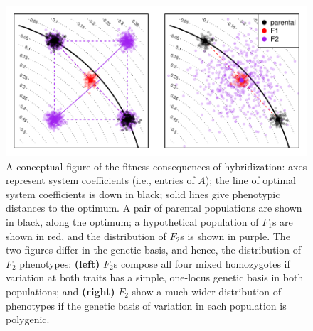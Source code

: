 \documentclass{article}
\newcommand{\1}{\mathbbm{1}}
\begin{document}
\begin{figure}[H]
\centering
\includegraphics{figures/conceptual_fig}
\caption{
    \label{fig:conceptual_fig}
    A conceptual figure of the fitness consequences of hybridization:
    axes represent system coefficients (i.e., entries of $A$);
    the line of optimal system coefficients is down in black;
    solid lines give phenotypic distances to the optimum.
    A pair of parental populations are shown in black, along the optimum;
    a hypothetical population of $F_1$s are shown in red,
    and the distribution of $F_2$s is shown in purple.
    The two figures differ in the genetic basis, and hence,
    the distribution of $F_2$ phenotypes:
    \textbf{(left)}
    $F_2$s compose all four mixed homozygotes if variation at both
    traits has a simple, one-locus genetic basis in both populations; and
    \textbf{(right)}
    $F_2$ show a much wider distribution of phenotypes
    if the genetic basis of variation in each population is polygenic.
}
\end{figure}
\end{document}
